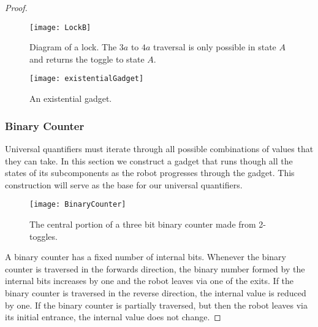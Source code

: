 \begin{proof}
\begin{wrapfigure}{tr}{0.45\textwidth}
\vspace{-5mm}
  \centering
    \texttt{[image: LockB]}
    \caption{Diagram of a lock. The $3a$ to $4a$ traversal is only possible in state $A$ and returns the toggle to state $A$.}
    \label{fig:LockA}
\vspace{-7mm}
\end{wrapfigure}

\begin{figure}[h!]
\centering
    \texttt{[image: existentialGadget]}
    \caption{An existential gadget.} %
    \label{fig:Existential}
\end{figure}

\subsubsection{Binary Counter}
\label{sec:BinaryCounter}
Universal quantifiers must iterate through all possible combinations of values that they can take. In this section we construct a gadget that runs though all the states of its subcomponents as the robot progresses through the gadget. This construction will serve as the base for our universal quantifiers.

\begin{figure}[h!]
\centering
    \texttt{[image: BinaryCounter]}
    \caption{The central portion of a three bit binary counter made from 2-toggles.}
    \label{fig:BinaryCounter}
\end{figure}
  
A binary counter has a fixed number of internal bits.
Whenever the binary counter is traversed in the forwards direction, the binary number
formed by the internal bits increases by one and the robot leaves via one of the exits.
If the binary counter is traversed in the reverse direction, the internal value is reduced by
one. If the binary counter is partially traversed, but then the robot leaves via its initial entrance,
the internal value does not change.


\end{proof}

